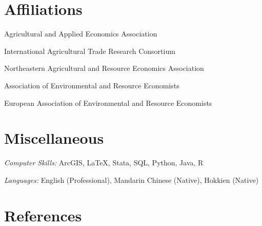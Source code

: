 \documentclass[10.5 pt,letterpaper]{article}
\renewenvironment{itemize}{
	\begin{list}{}{
			\setlength{\leftmargin}{1.5em}
		}
	}{
	\end{list}
}
\begin{document}
		\section*{\textbf{Affiliations}}
	\begin{itemize}
		\item[-] Agricultural and Applied Economics Association
		\item[-] International Agricultural Trade Research Consortium
		\item[-] Northeastern Agricultural and Resource Economics Association
		\item[-] Association of Environmental and Resource Economists
		\item[-] European Association of Environmental and Resource Economists
		
	\end{itemize}
	
	
	
	\section*{\textbf{Miscellaneous}}
	\begin{itemize}
		\item[-] \textit{Computer Skills:} ArcGIS, \LaTeX, Stata, SQL, Python,   Java, R
		\item[-] \textit{Languages:}  English (Professional),  Mandarin Chinese (Native), Hokkien (Native)
		
	\end{itemize}
	
	
	
	
	\newpage
	
	\section*{\textbf{References}}
	
\end{document}
